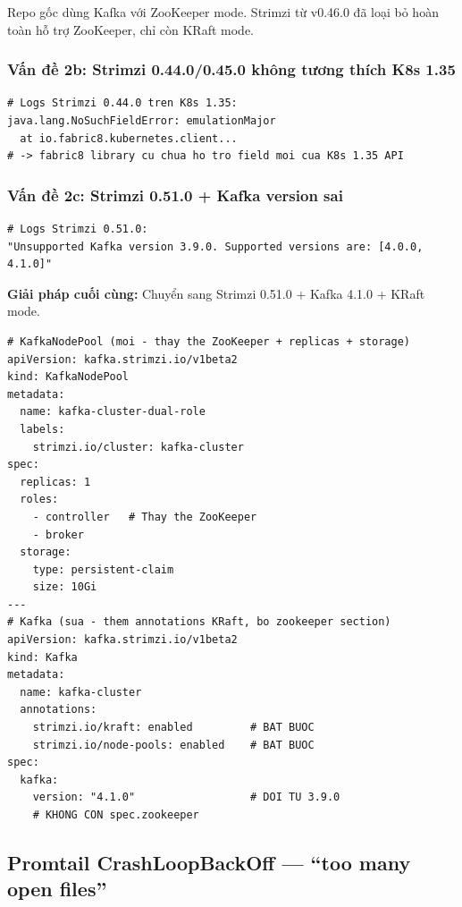 Repo gốc dùng Kafka với ZooKeeper mode. Strimzi từ v0.46.0 đã loại bỏ hoàn toàn
hỗ trợ ZooKeeper, chỉ còn KRaft mode.

\subsubsection{Vấn đề 2b: Strimzi 0.44.0/0.45.0 không tương thích K8s 1.35}

\begin{lstlisting}[style=bashstyle]
# Logs Strimzi 0.44.0 tren K8s 1.35:
java.lang.NoSuchFieldError: emulationMajor
  at io.fabric8.kubernetes.client...
# -> fabric8 library cu chua ho tro field moi cua K8s 1.35 API
\end{lstlisting}

\subsubsection{Vấn đề 2c: Strimzi 0.51.0 + Kafka version sai}

\begin{lstlisting}[style=bashstyle]
# Logs Strimzi 0.51.0:
"Unsupported Kafka version 3.9.0. Supported versions are: [4.0.0, 4.1.0]"
\end{lstlisting}

\textbf{Giải pháp cuối cùng:} Chuyển sang Strimzi 0.51.0 + Kafka 4.1.0 + KRaft mode.

\begin{lstlisting}[style=yamlstyle, caption=Cấu trúc kafka-cluster.yaml sau khi sửa]
# KafkaNodePool (moi - thay the ZooKeeper + replicas + storage)
apiVersion: kafka.strimzi.io/v1beta2
kind: KafkaNodePool
metadata:
  name: kafka-cluster-dual-role
  labels:
    strimzi.io/cluster: kafka-cluster
spec:
  replicas: 1
  roles:
    - controller   # Thay the ZooKeeper
    - broker
  storage:
    type: persistent-claim
    size: 10Gi
---
# Kafka (sua - them annotations KRaft, bo zookeeper section)
apiVersion: kafka.strimzi.io/v1beta2
kind: Kafka
metadata:
  name: kafka-cluster
  annotations:
    strimzi.io/kraft: enabled         # BAT BUOC
    strimzi.io/node-pools: enabled    # BAT BUOC
spec:
  kafka:
    version: "4.1.0"                  # DOI TU 3.9.0
    # KHONG CON spec.zookeeper
\end{lstlisting}

\subsection{Promtail CrashLoopBackOff — ``too many open files''}

